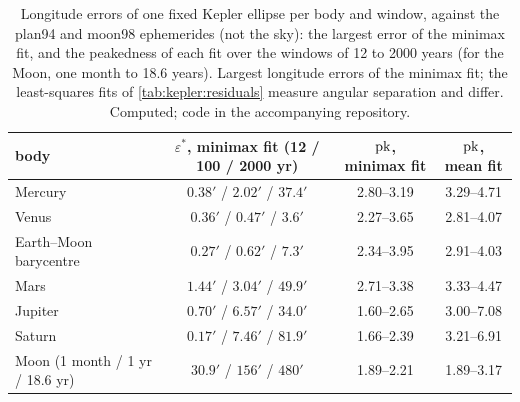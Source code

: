 \begin{table}[t]
\centering\small
\begin{tabular}{lccc}
\toprule
body & $\varepsilon^*$, minimax fit (12 / 100 / 2000 yr) & $\mathrm{pk}$, minimax fit & $\mathrm{pk}$, mean fit\\
\midrule
Mercury & $0.38'$ / $2.02'$ / $37.4'$ & 2.80--3.19 & 3.29--4.71\\
Venus & $0.36'$ / $0.47'$ / $3.6'$ & 2.27--3.65 & 2.81--4.07\\
Earth--Moon barycentre & $0.27'$ / $0.62'$ / $7.3'$ & 2.34--3.95 & 2.91--4.03\\
Mars & $1.44'$ / $3.04'$ / $49.9'$ & 2.71--3.38 & 3.33--4.47\\
Jupiter & $0.70'$ / $6.57'$ / $34.0'$ & 1.60--2.65 & 3.00--7.08\\
Saturn & $0.17'$ / $7.46'$ / $81.9'$ & 1.66--2.39 & 3.21--6.91\\
Moon (1 month / 1 yr / 18.6 yr) & $30.9'$ / $156'$ / $480'$ & 1.89--2.21 & 1.89--3.17\\
\bottomrule
\end{tabular}
\caption{Longitude errors of one fixed Kepler ellipse per body and window, against the plan94 and moon98 ephemerides (not the sky): the largest error of the minimax fit, and the peakedness of each fit over the windows of 12 to 2000 years (for the Moon, one month to 18.6 years). Largest longitude errors of the minimax fit; the least-squares fits of \cref{tab:kepler:residuals} measure angular separation and differ. Computed; code in the accompanying repository.}\label{tab:laws:residuals}
\end{table}

